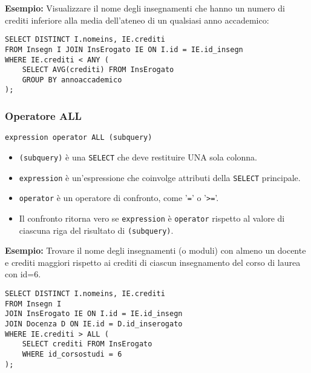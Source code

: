 \documentclass[a4paper, 10pt, titlepage]{article}
\begin{document}
		\textbf{Esempio:} Visualizzare il nome degli insegnamenti che hanno un numero di crediti
		inferiore alla media dell’ateneo di un qualsiasi anno accademico:
		\begin{lstlisting}
SELECT DISTINCT I.nomeins, IE.crediti
FROM Insegn I JOIN InsErogato IE ON I.id = IE.id_insegn
WHERE IE.crediti < ANY (
    SELECT AVG(crediti) FROM InsErogato
    GROUP BY annoaccademico
);
		\end{lstlisting}
		\medskip 
	\subsubsection*{Operatore ALL}
		\begin{lstlisting}
expression operator ALL (subquery)
		\end{lstlisting}
		\begin{itemize}
		\item \lstinline|(subquery)| è una \lstinline|SELECT| che deve restituire UNA sola colonna.
		\item \lstinline|expression| è un’espressione che coinvolge attributi della \lstinline|SELECT|
		principale.
		\item \lstinline|operator| è un operatore di confronto, come ’\lstinline|=|’ o ’\lstinline|>=|’.
		\item Il confronto ritorna vero se \lstinline|expression| è \lstinline|operator| rispetto al valore di ciascuna riga del risultato di \lstinline|(subquery)|.
		\end{itemize}
\medskip 		
		\textbf{Esempio:} Trovare il nome degli insegnamenti (o moduli) con almeno un docente e
		crediti maggiori rispetto ai crediti di ciascun insegnamento del corso di laurea
		con id=6.
		\begin{lstlisting}
SELECT DISTINCT I.nomeins, IE.crediti
FROM Insegn I
JOIN InsErogato IE ON I.id = IE.id_insegn
JOIN Docenza D ON IE.id = D.id_inserogato
WHERE IE.crediti > ALL (
    SELECT crediti FROM InsErogato
    WHERE id_corsostudi = 6
);
		\end{lstlisting}
		\newpage
\end{document}
